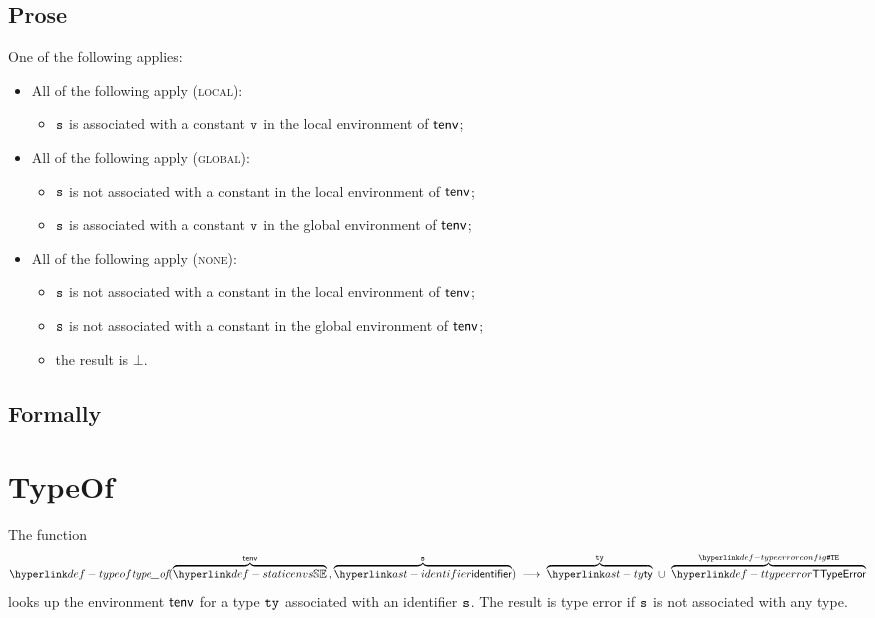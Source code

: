\subsection{Prose}
One of the following applies:
\begin{itemize}
  \item All of the following apply (\textsc{local}):
  \begin{itemize}
    \item $\texttt{s}$ is associated with a constant $\texttt{v}$ in the local environment of $\textsf{tenv}$;
  \end{itemize}

  \item All of the following apply (\textsc{global}):
  \begin{itemize}
    \item $\texttt{s}$ is not associated with a constant in the local environment of $\textsf{tenv}$;
    \item $\texttt{s}$ is associated with a constant $\texttt{v}$ in the global environment of $\textsf{tenv}$;
  \end{itemize}

  \item All of the following apply (\textsc{none}):
  \begin{itemize}
    \item $\texttt{s}$ is not associated with a constant in the local environment of $\textsf{tenv}$;
    \item $\texttt{s}$ is not associated with a constant in the global environment of $\textsf{tenv}$;
    \item the result is $\bot$.
  \end{itemize}
\end{itemize}

\subsection{Formally}

\section{TypeOf}
\hypertarget{def-typeof}{}
The function
\[
  \typeof(\overname{\staticenvs}{\tenv} \aslsep \overname{\identifier}{\vs})
  \;\aslto\; \overname{\ty}{\tty}\ \cup\ \overname{\TTypeError}{\TypeErrorConfig}
\]
looks up the environment $\textsf{tenv}$ for a type $\texttt{ty}$ associated with an identifier
$\texttt{s}$. The result is type error if $\texttt{s}$ is not associated with any type.

